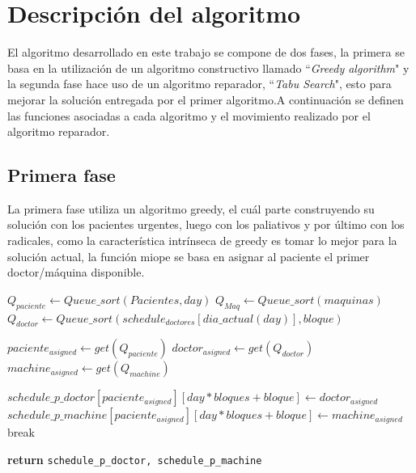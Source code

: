 \documentclass[letter, 10pt]{article}
\begin{document}
\newpage
\section{Descripción del algoritmo}
El algoritmo desarrollado en este trabajo se compone de dos fases, la primera se basa en la utilización de un algoritmo constructivo llamado ``\textit{Greedy algorithm}" y la segunda fase hace uso de un algoritmo reparador, ``\textit{Tabu Search}", esto para mejorar la solución entregada por el primer algoritmo.A continuación se definen las funciones asociadas a cada algoritmo y el movimiento realizado por el algoritmo reparador.

\subsection{Primera fase}
La primera fase utiliza un algoritmo greedy, el cuál parte construyendo su solución con los pacientes urgentes, luego con los paliativos y por último con los radicales, como la característica intrínseca de greedy es tomar lo mejor para la solución actual, la función miope se basa en asignar al paciente el primer doctor/máquina disponible.

\begin{algorithm}[H]
  \caption{$Greedy Algorithm$}\label{greedy}
  \begin{algorithmic}[1]
        \State $Q_{paciente}\gets Queue\_sort(Pacientes, day)$
            \State $ Q_{Maq}\gets Queue\_sort(maquinas)$
            \State $ Q_{doctor}\gets Queue\_sort(schedule_{doctores}[dia\_actual(day)], bloque)$
            
            
                \State $ paciente_{asigned}\gets get(Q_{paciente})$
                \State $ doctor_{asigned}\gets get(Q_{doctor})$
                \State $ machine_{asigned}\gets get(Q_{machine})$ 

                \State $ schedule\_p\_doctor[paciente_{asigned}][day*bloques + bloque] \gets doctor_{asigned}$
                \State $ schedule\_p\_machine[paciente_{asigned}][day*bloques + bloque]\gets machine_{asigned}$
                       \State break\;
                \EndIf
                
            \EndWhile
        \EndFor
    \EndFor
      \State \textbf{return} \texttt{schedule\_p\_doctor, schedule\_p\_machine}
    \EndProcedure
  \end{algorithmic}
\end{algorithm}
\end{document}
